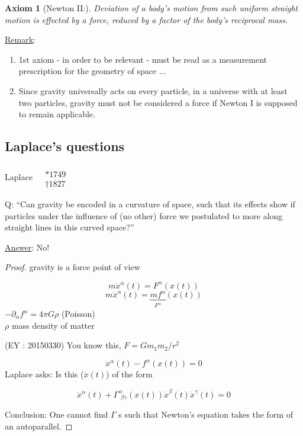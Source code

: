 \documentclass[10pt, twoside]{amsart}
\newtheorem{axiom}{Axiom}
\begin{document}
\begin{multicols*}{2}
\begin{axiom}[Newton II:]
Deviation of a body's motion from such uniform straight motion is effected by a force, reduced by a factor of the body's reciprocal mass.  
\end{axiom}

\underline{Remark}: \begin{enumerate}
\item[(1)] 1st axiom - in order to be relevant - must be read as a measurement prescription for the geometry of space $\dots $
\item[(2)] Since gravity universally acts on every particle, in a universe with at least two particles, gravity must not be considered a force if Newton I is supposed to remain applicable.  
\end{enumerate}

\subsection{Laplace's questions} Laplace $\begin{aligned}  & \quad \\ 
  & * 1749 \\
  & \dag 1827  \end{aligned}$

Q: ``Can gravity be encoded in a curvature of space, such that its effects show if particles under the influence of (no other) force we postulated to more along straight lines in this curved space?''

\underline{Answer}: No!

\begin{proof}
gravity is a force point of view


\[
m \ddot{x}^{\alpha}(t) = F^{\alpha}(x(t))
\]
\[
m\ddot{x}^{\alpha}(t) = \underbrace{mf^{\alpha}}_{F^{\alpha}}(x(t))
\]
$-\partial_{\alpha} f^{\alpha} = 4\pi G\rho$ (Poisson) \\
$\rho $ mass density of matter

(EY : 20150330) You know this, $F=Gm_1m_2/r^2$

\[
\ddot{x}^{\alpha}(t) - f^{\alpha}(x(t)) = 0 
\]
Laplace asks: Is this ($\ddot{x}(t)$) of the form 

\[
\ddot{x}^{\alpha}(t) + \Gamma^{\alpha}_{\, \, \beta \gamma}(x(t)) \dot{x}^{\beta}(t) \dot{x}^{\gamma}(t) = 0 
\]

Conclusion: One cannot find $\Gamma$ s such that Newton's equation takes the form of an autoparallel.


\end{proof}
\end{multicols*}
\end{document}
